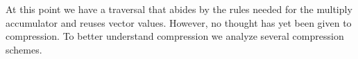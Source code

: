 %
At this point we have a traversal that abides by the rules needed for the multiply accumulator and reuses vector values. However, no thought has yet been given to compression. To better understand compression we analyze several compression schemes.
